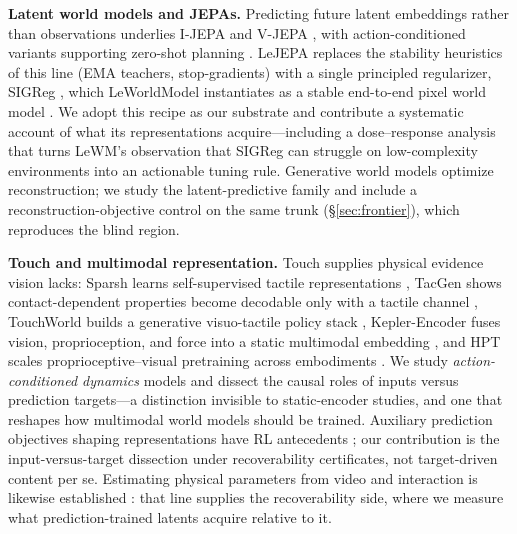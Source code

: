 \documentclass{article} %
\begin{document}
\textbf{Latent world models and JEPAs.} Predicting future latent embeddings
rather than observations underlies I-JEPA and V-JEPA
\citep{assran2023ijepa,assran2025vjepa2}, with action-conditioned variants
supporting zero-shot planning \citep{assran2025vjepa2,zhou2024dinowm}. LeJEPA
replaces the stability heuristics of this line (EMA teachers, stop-gradients)
with a single principled regularizer, SIGReg \citep{balestriero2025lejepa},
which LeWorldModel instantiates as a stable end-to-end pixel world model
\citep{maes2026lewm}. We adopt this recipe as our substrate and contribute a
systematic account of what its representations acquire---including a
dose--response analysis that turns LeWM's observation that SIGReg can struggle
on low-complexity environments into an actionable tuning rule. Generative world
models \citep{hafner2023dreamerv3} optimize reconstruction; we study the
latent-predictive family and include a reconstruction-objective control on the
same trunk (\S\ref{sec:frontier}), which reproduces the blind region.

\textbf{Touch and multimodal representation.} Touch supplies physical evidence
vision lacks: Sparsh learns self-supervised tactile representations
\citep{sparsh2024}, TacGen shows contact-dependent properties become decodable
only with a tactile channel \citep{tacgen2026}, TouchWorld builds a generative
visuo-tactile policy stack \citep{touchworld2026}, Kepler-Encoder fuses
vision, proprioception, and force into a static multimodal embedding
\citep{kepler2026}, and HPT scales proprioceptive--visual pretraining across
embodiments \citep{hpt2024}. We study \emph{action-conditioned dynamics}
models and dissect the causal roles of inputs versus prediction targets---a
distinction invisible to static-encoder studies, and one that reshapes how
multimodal world models should be trained. Auxiliary prediction objectives
shaping representations have RL antecedents \citep{jaderberg2017unreal,
gelada2019deepmdp,guo2020pbl}; our contribution is the input-versus-target
dissection under recoverability certificates, not target-driven content per
se. Estimating physical parameters from video and interaction is likewise
established \citep{wu2015galileo,wu2016physics101,xu2019densephysnet}: that
line supplies the recoverability side, where we measure what
prediction-trained latents acquire relative to it.
\end{document}
